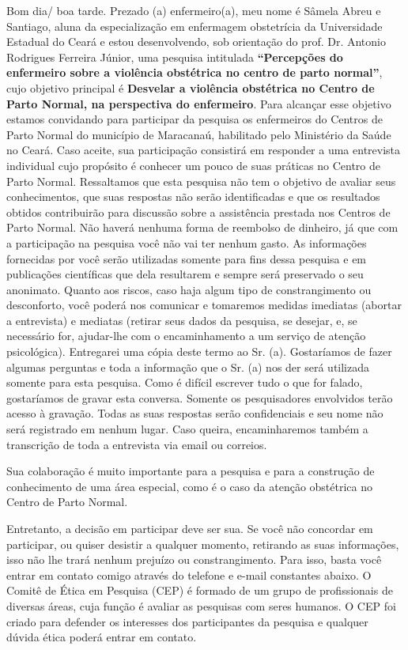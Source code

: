 \label{ap:tcle}

Bom dia/ boa tarde. Prezado (a) enfermeiro(a), meu nome é Sâmela Abreu e Santiago, aluna da especialização em enfermagem obstetrícia da Universidade Estadual do Ceará e estou desenvolvendo, sob orientação do prof. Dr. Antonio Rodrigues Ferreira Júnior, uma pesquisa intitulada  \textbf{``Percepções do enfermeiro sobre a violência obstétrica no centro de parto normal''}, cujo objetivo principal é \textbf{Desvelar a violência obstétrica no Centro de Parto Normal, na perspectiva do enfermeiro}. Para alcançar esse objetivo estamos convidando para participar da pesquisa os enfermeiros do Centros de Parto Normal do município de Maracanaú, habilitado pelo Ministério da Saúde no Ceará. Caso aceite, sua participação consistirá em responder a uma entrevista individual cujo propósito é conhecer um pouco de suas práticas no Centro de Parto Normal. Ressaltamos que esta pesquisa não tem o objetivo de avaliar seus conhecimentos, que suas respostas não serão identificadas e que os resultados obtidos contribuirão para discussão sobre a assistência prestada nos Centros de Parto Normal. Não haverá nenhuma forma de reembolso de dinheiro, já que com a participação na pesquisa você não vai ter nenhum gasto. As informações fornecidas por você serão utilizadas somente para fins dessa pesquisa e em publicações científicas que dela resultarem e sempre será preservado o seu anonimato. Quanto aos riscos, caso haja algum tipo de constrangimento ou desconforto, você poderá nos comunicar e tomaremos medidas imediatas (abortar a entrevista) e mediatas (retirar seus dados da pesquisa, se desejar, e, se necessário for, ajudar-lhe com o encaminhamento a um serviço de atenção psicológica). Entregarei uma cópia deste termo ao Sr. (a). Gostaríamos de fazer algumas perguntas e toda a informação que o Sr. (a) nos der será utilizada somente para esta pesquisa. Como é difícil escrever tudo o que for falado, gostaríamos de gravar esta conversa. Somente os pesquisadores envolvidos terão acesso à gravação. Todas as suas respostas serão confidenciais e seu nome não será registrado em nenhum lugar. Caso queira, encaminharemos também a transcrição de toda a entrevista via email ou correios. 

Sua colaboração é muito importante para a pesquisa e para a construção de conhecimento de uma área especial, como é o caso da atenção obstétrica no Centro de Parto Normal. 

Entretanto, a decisão em participar deve ser sua. Se você não concordar em participar, ou quiser desistir a qualquer momento, retirando as suas informações, isso não lhe trará nenhum prejuízo ou constrangimento. Para isso, basta você entrar em contato comigo através do telefone e e-mail constantes abaixo. O Comitê de Ética em Pesquisa (CEP) é formado de um grupo de profissionais de diversas áreas, cuja função é avaliar as pesquisas com seres humanos. O CEP foi criado para defender os interesses dos participantes da pesquisa e qualquer dúvida ética poderá entrar em contato.

